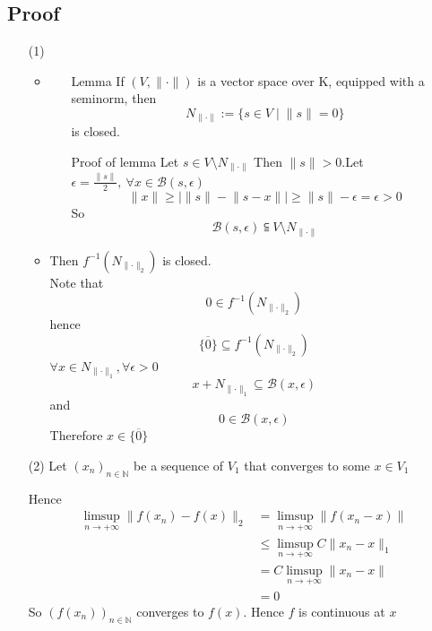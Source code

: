 \documentclass{book}
\begin{document}
\subsection*{Proof}
\begin{itemize}
    \item [(1)]
    \begin{itemize}
        \item
        \begin{itemize}
            \item [Lemma] If $(V,\lVert\cdot\rVert)$ is a vector space over K, equipped with a seminorm, then $$N_{\lVert\cdot\rVert}:=\{s\in V\mid\lVert s\rVert=0\}$$ is closed.
            \item [Proof of lemma]
                Let $s\in V\setminus N_{\lVert\cdot\rVert}$ Then $\lVert s\rVert>0$.Let $\epsilon=\frac{\lVert s\rVert}{2},\ \forall x\in \mathcal{B}(s,\epsilon)$$$\lVert x\rVert\geq\lvert\lVert s\rVert-\lVert s-x\rVert\rvert\geq \lVert s\rVert-\epsilon=\epsilon>0$$ So $$\mathcal{B}(s,\epsilon)\subseteqq V\setminus N_{\lVert\cdot\rVert}$$ 
        \end{itemize} 
        \item Then $f^{-1}(N_{\lVert\cdot\rVert _2})$ is closed.\\
        Note that $$0\in f^{-1}(N_{\lVert\cdot\rVert _2})$$ hence $$\overline{\{0\}}\subseteq f^{-1}(N_{\lVert\cdot\rVert _2})$$
        $\forall x\in N_{\lVert\cdot\rVert _1},\forall \epsilon>0$$$x+N_{\lVert\cdot\rVert _1}\subseteq \mathcal{B}(x,\epsilon)$$ and $$0\in \mathcal{B}(x,\epsilon)$$
        Therefore $x\in \overline{\{0\}}$
    \end{itemize}
    \item[(2)]
        Let $(x_n)_{n\in \mathbb{N}}$ be a sequence of $V_1$ that converges to some $x\in V_1$

        Hence $$
        \begin{aligned}
            \limsup\limits_{n\rightarrow+\infty}\lVert f(x_n)-f(x)\rVert _2
            &=\limsup\limits_{n\rightarrow+\infty}\lVert f(x_n-x)\rVert\\
            &\leq \limsup\limits_{n\rightarrow+\infty} C\lVert x_n-x\rVert _1\\
            &=C\limsup\limits_{n\rightarrow+\infty}\lVert x_n-x\rVert\\ &=0
        \end{aligned}
        $$
        So $(f(x_n))_{n\in \mathbb{N}}$ converges to $f(x)$. Hence $f$ is continuous at $x$


\end{itemize}
\end{document}
